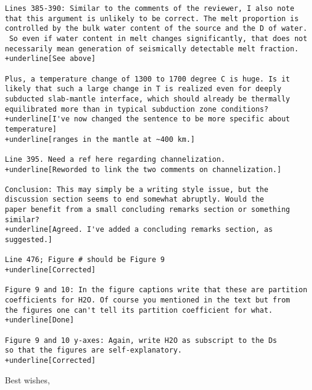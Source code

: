 \documentclass[10pt]{letter}
\begin{document}
\begin{letter}{}
\begin{Verbatim}[commandchars=+\[\]]
Lines 385-390: Similar to the comments of the reviewer, I also note 
that this argument is unlikely to be correct. The melt proportion is 
controlled by the bulk water content of the source and the D of water.
 So even if water content in melt changes significantly, that does not 
necessarily mean generation of seismically detectable melt fraction. 
+underline[See above]

Plus, a temperature change of 1300 to 1700 degree C is huge. Is it 
likely that such a large change in T is realized even for deeply 
subducted slab-mantle interface, which should already be thermally 
equilibrated more than in typical subduction zone conditions?
+underline[I've now changed the sentence to be more specific about temperature]
+underline[ranges in the mantle at ~400 km.]

Line 395. Need a ref here regarding channelization.
+underline[Reworded to link the two comments on channelization.]

Conclusion: This may simply be a writing style issue, but the 
discussion section seems to end somewhat abruptly. Would the 
paper benefit from a small concluding remarks section or something 
similar?
+underline[Agreed. I've added a concluding remarks section, as suggested.]

Line 476; Figure # should be Figure 9
+underline[Corrected]

Figure 9 and 10: In the figure captions write that these are partition 
coefficients for H2O. Of course you mentioned in the text but from 
the figures one can't tell its partition coefficient for what.
+underline[Done]

Figure 9 and 10 y-axes: Again, write H2O as subscript to the Ds 
so that the figures are self-explanatory.
+underline[Corrected]
\end{Verbatim}
\closing{Best wishes,}

\end{letter}
\end{document}
